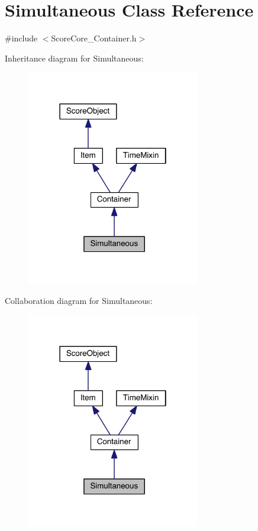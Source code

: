 \hypertarget{class_simultaneous}{\section{Simultaneous Class Reference}
\label{class_simultaneous}
}


{\ttfamily \#include $<$Score\-Core\-\_\-\-Container.\-h$>$}



Inheritance diagram for Simultaneous\-:\nopagebreak
\begin{figure}[H]
\begin{center}
\leavevmode
\includegraphics[width=214pt]{class_simultaneous__inherit__graph}
\end{center}
\end{figure}


Collaboration diagram for Simultaneous\-:\nopagebreak
\begin{figure}[H]
\begin{center}
\leavevmode
\includegraphics[width=214pt]{class_simultaneous__coll__graph}
\end{center}
\end{figure}
